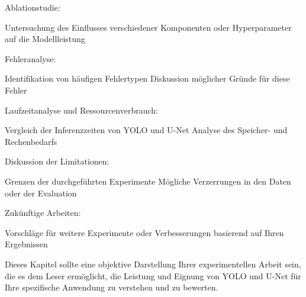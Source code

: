 Ablationstudie:

Untersuchung des Einflusses verschiedener Komponenten oder Hyperparameter auf die Modellleistung


Fehleranalyse:

Identifikation von häufigen Fehlertypen
Diskussion möglicher Gründe für diese Fehler


Laufzeitanalyse und Ressourcenverbrauch:

Vergleich der Inferenzzeiten von YOLO und U-Net
Analyse des Speicher- und Rechenbedarfs


Diskussion der Limitationen:

Grenzen der durchgeführten Experimente
Mögliche Verzerrungen in den Daten oder der Evaluation


Zukünftige Arbeiten:

Vorschläge für weitere Experimente oder Verbesserungen basierend auf Ihren Ergebnissen



Dieses Kapitel sollte eine objektive Darstellung Ihrer experimentellen Arbeit sein, die es dem Leser ermöglicht, die Leistung und Eignung von YOLO und U-Net für Ihre spezifische Anwendung zu verstehen und zu bewerten.
